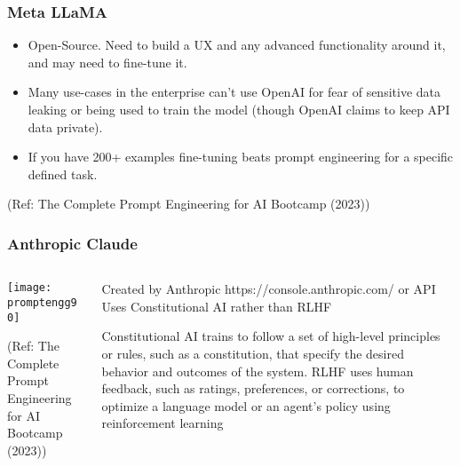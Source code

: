 \begin{frame}[fragile]\frametitle{Meta LLaMA}

\begin{itemize}
\item  Open-Source. Need to build a UX and any advanced functionality around it, and may need to fine-tune it.
\item Many use-cases in the enterprise can’t use OpenAI for fear of sensitive data leaking or being used to train the model (though OpenAI claims to keep API data private).
\item If you have 200+ examples fine-tuning beats prompt engineering for a specific defined task.
\end{itemize}	 

{\tiny (Ref: The Complete Prompt Engineering for AI Bootcamp (2023))}

\end{frame}

\begin{frame}[fragile]\frametitle{Anthropic Claude}


\begin{columns}
    \begin{column}[T]{0.6\linewidth}
		\begin{center}
		\texttt{[image: promptengg90]}

		{\tiny (Ref: The Complete Prompt Engineering for AI Bootcamp (2023))}
		\end{center}	
    \end{column}
    \begin{column}[T]{0.4\linewidth}
		Created by Anthropic 
		https://console.anthropic.com/ or API
		Uses Constitutional AI rather than RLHF
		
		Constitutional AI trains to follow a set of high-level principles or rules, such as a constitution, that specify the desired behavior and outcomes of the system.
		RLHF uses human feedback, such as ratings, preferences, or corrections, to optimize a language model or an agent’s policy using reinforcement learning
    \end{column}
  \end{columns}
\end{frame}



